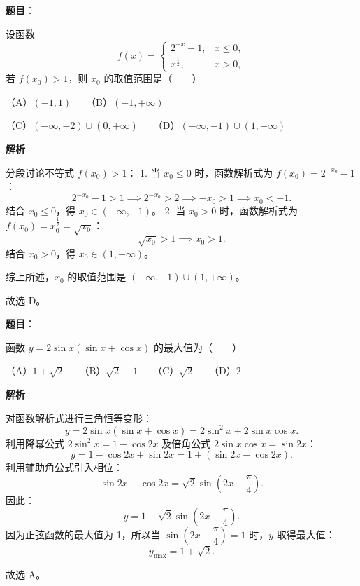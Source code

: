 \begin{answer}

\textbf{题目}：

设函数
\nopagebreak[4]
\[f(x) = \begin{cases} 2^{-x} - 1, & x \le 0, \\ x^{\frac{1}{2}}, & x > 0, \end{cases}\]
若 $f(x_0) > 1$，则 $x_0$ 的取值范围是\mbox{（　　）}

（A）$(-1, 1)$　　（B）$(-1, +\infty)$

（C）$(-\infty, -2) \cup (0, +\infty)$　　（D）$(-\infty, -1) \cup (1, +\infty)$

\textbf{解析}

分段讨论不等式 $f(x_0) > 1$：
1. 当 $x_0 \le 0$ 时，函数解析式为 $f(x_0) = 2^{-x_0} - 1$：
\nopagebreak[4]
\[2^{-x_0} - 1 > 1 \implies 2^{-x_0} > 2 \implies -x_0 > 1 \implies x_0 < -1.\]
   结合 $x_0 \le 0$，得 $x_0 \in (-\infty, -1)$。
2. 当 $x_0 > 0$ 时，函数解析式为 $f(x_0) = x_0^{\frac{1}{2}} = \sqrt{x_0}$：
\nopagebreak[4]
\[\sqrt{x_0} > 1 \implies x_0 > 1.\]
   结合 $x_0 > 0$，得 $x_0 \in (1, +\infty)$。

综上所述，$x_0$ 的取值范围是 $(-\infty, -1) \cup (1, +\infty)$。

故选 D。


\end{answer}
\begin{answer}

\textbf{题目}：

函数 $y = 2\sin x(\sin x + \cos x)$ 的最大值为\mbox{（　　）}

（A）$1 + \sqrt{2}$　　（B）$\sqrt{2} - 1$　　（C）$\sqrt{2}$　　（D）2

\textbf{解析}

对函数解析式进行三角恒等变形：
\nopagebreak[4]
\[y = 2\sin x(\sin x + \cos x) = 2\sin^2 x + 2\sin x\cos x.\]
利用降幂公式 $2\sin^2 x = 1 - \cos 2x$ 及倍角公式 $2\sin x\cos x = \sin 2x$：
\nopagebreak[4]
\[y = 1 - \cos 2x + \sin 2x = 1 + (\sin 2x - \cos 2x).\]
利用辅助角公式引入相位：
\nopagebreak[4]
\[\sin 2x - \cos 2x = \sqrt{2}\sin\left(2x - \frac{\pi}{4}\right).\]
因此：
\nopagebreak[4]
\[y = 1 + \sqrt{2}\sin\left(2x - \frac{\pi}{4}\right).\]
因为正弦函数的最大值为 1，所以当 $\sin\left(2x - \dfrac{\pi}{4}\right) = 1$ 时，$y$ 取得最大值：
\nopagebreak[4]
\[y_{\max} = 1 + \sqrt{2}.\]

故选 A。


\end{answer}
